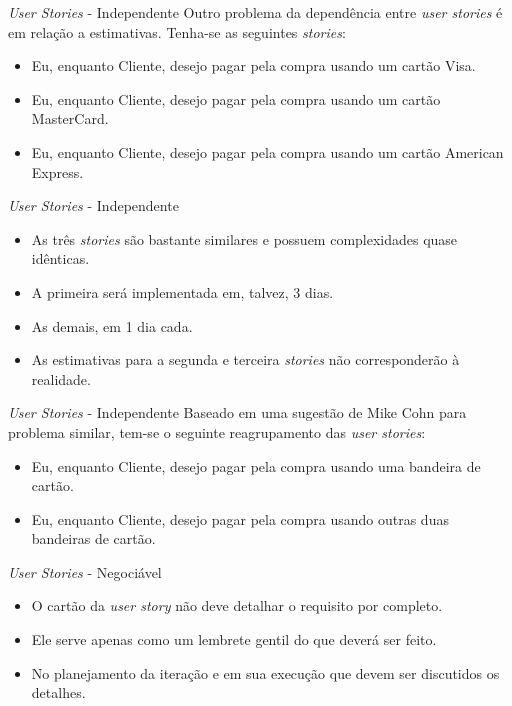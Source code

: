 \documentclass[11pt]{beamer}
\begin{document}
   \begin{frame}{\textit{User Stories} - Independente}
      Outro problema da dependência entre \textit{user stories} é em relação a estimativas. Tenha-se as seguintes \textit{stories}:
      \begin{itemize}
         \item Eu, enquanto Cliente, desejo pagar pela compra usando um cartão Visa.
         \item Eu, enquanto Cliente, desejo pagar pela compra usando um cartão MasterCard.
         \item Eu, enquanto Cliente, desejo pagar pela compra usando um cartão American Express.
      \end{itemize}
   \end{frame}

   \begin{frame}{\textit{User Stories} - Independente}
      \begin{itemize}
         \item As três \textit{stories} são bastante similares e possuem complexidades quase idênticas.
         \item A primeira será implementada em, talvez, 3 dias.
         \item As demais, em 1 dia cada. 
         \item As estimativas para a segunda e terceira \textit{stories} não corresponderão à realidade.
      \end{itemize}
   \end{frame}

   \begin{frame}{\textit{User Stories} - Independente}
      Baseado em uma sugestão de Mike Cohn para problema similar, tem-se o seguinte reagrupamento das \textit{user stories}:
      \begin{itemize}
         \item Eu, enquanto Cliente, desejo pagar pela compra usando uma bandeira de cartão.
         \item Eu, enquanto Cliente, desejo pagar pela compra usando outras duas bandeiras de cartão.
      \end{itemize}
   \end{frame}

   \begin{frame}{\textit{User Stories} - Negociável}
      \begin{itemize}
         \item O cartão da \textit{user story} não deve detalhar o requisito por completo.
         \item Ele serve apenas como um lembrete gentil do que deverá ser feito.
         \item No planejamento da iteração e em sua execução que devem ser discutidos os detalhes.
      \end{itemize}
   \end{frame}
\end{document}
